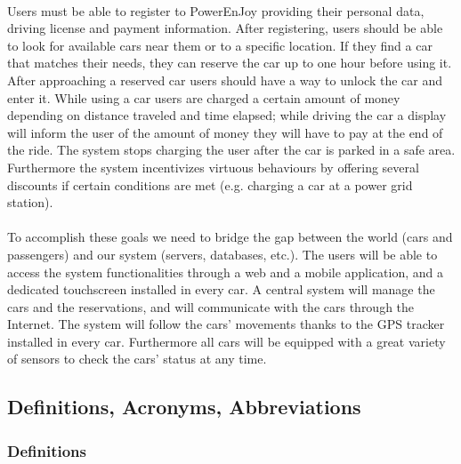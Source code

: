 \documentclass[english]{article}
\begin{document}
\paragraph{}
Users must be able to register to PowerEnJoy providing their personal data, driving license and payment information.
After registering, users should be able to look for available cars near them or to a specific location. If they find a car that matches their needs, they can reserve the car up to one hour before using it. After approaching a reserved car users should have a way to unlock the car and enter it. 
While using a car users are charged a certain amount of money depending on distance traveled and time elapsed; while driving the car a display will inform the user of the amount of money they will have to pay at the end of the ride.
The system stops charging the user after the car is parked in a safe area.
Furthermore the system incentivizes virtuous behaviours by offering several discounts if certain conditions are met (e.g. charging a car at a power grid station).

\paragraph{}
To accomplish these goals we need to bridge the gap between the world (cars and passengers) and our system (servers, databases, etc.).
The users will be able to access the system functionalities through a web and a mobile application, and a dedicated touchscreen installed in every car.
A central system will manage the cars and the reservations, and will communicate with the cars through the Internet. The system will follow the cars’ movements thanks to the GPS tracker installed in every car. Furthermore all cars will be equipped with a great variety of sensors to check the cars’ status at any time.


\subsection{Definitions, Acronyms, Abbreviations}

\subsubsection{Definitions}
\end{document}
